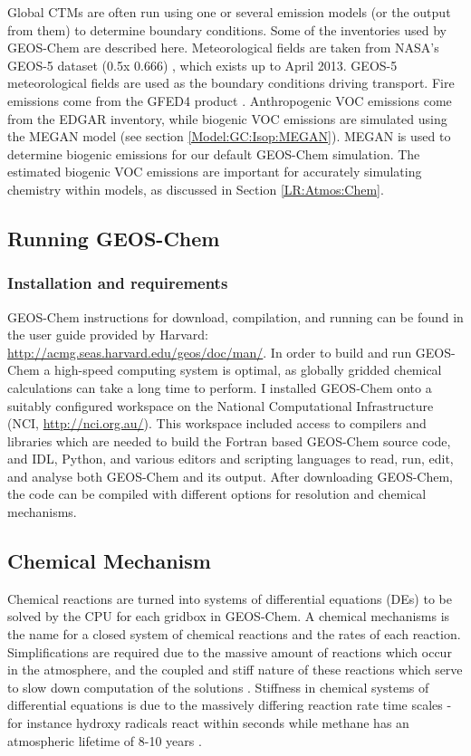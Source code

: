     
    Global CTMs are often run using one or several emission models (or the output from them) to determine boundary conditions.
    Some of the inventories used by GEOS-Chem are described here.
    Meteorological fields are taken from NASA's GEOS-5 dataset (0.5\degr x 0.666\degr) \parencite{Chen2009}, which exists up to April 2013.
    GEOS-5 meteorological fields are used as the boundary conditions driving transport.
    Fire emissions come from the GFED4 product \parencite{Giglio2013}. 
    Anthropogenic VOC emissions come from the EDGAR inventory, while biogenic VOC emissions are simulated using the MEGAN model (see section \ref{Model:GC:Isop:MEGAN}).
    MEGAN is used to determine biogenic emissions for our default GEOS-Chem simulation.
    The estimated biogenic VOC emissions are important for accurately simulating chemistry within models, as discussed in Section \ref{LR:Atmos:Chem}.
    
  
  \subsection{Running GEOS-Chem}
    \label{Model:GC:running}
    \subsubsection{Installation and requirements}
      GEOS-Chem instructions for download, compilation, and running can be found in the user guide provided by Harvard: \url{http://acmg.seas.harvard.edu/geos/doc/man/}.
      In order to build and run GEOS-Chem a high-speed computing system is optimal, as globally gridded chemical calculations can take a long time to perform.
      I installed GEOS-Chem onto a suitably configured workspace on the National Computational Infrastructure (NCI, \url{http://nci.org.au/}). 
      This workspace included access to compilers and libraries which are needed to build the Fortran based GEOS-Chem source code, and IDL, Python, and various editors and scripting languages to read, run, edit, and analyse both GEOS-Chem and its output.
      After downloading GEOS-Chem, the code can be compiled with different options for resolution and chemical mechanisms.
  
  \subsection{Chemical Mechanism}
    \label{Model:GC:Mechanisms}
    Chemical reactions are turned into systems of differential equations (DEs) to be solved by the CPU for each gridbox in GEOS-Chem.
    A chemical mechanisms is the name for a closed system of chemical reactions and the rates of each reaction.
    Simplifications are required due to the massive amount of reactions which occur in the atmosphere, and the coupled and stiff nature of these reactions which serve to slow down computation of the solutions \parencite{BrasseurJacob2017}.
    Stiffness in chemical systems of differential equations is due to the massively differing reaction rate time scales - for instance hydroxy radicals react within seconds while methane has an atmospheric lifetime of 8-10 years \parencite{Wuebbles2002}. 
    
